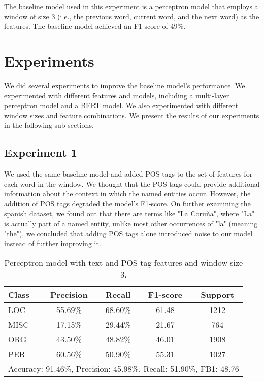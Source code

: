 \documentclass[12pt]{report}
\begin{document}
The baseline model used in this experiment is a perceptron model that employs a window of size 3 (i.e., the previous word, current word, and the next word) as the features. The baseline model achieved an F1-score of 49\%.

\section*{Experiments}

We did several experiments to improve the baseline model's performance. We experimented with different features and models, including a multi-layer perceptron model and a BERT model. We also experimented with different window sizes and feature combinations. We present the results of our experiments in the following sub-sections.
\subsection*{Experiment 1}

We used the same baseline model and added POS tags to the set of features for each word in the window. We thought that the POS tags could provide additional information about the context in which the named entities occur. However, the addition of POS tags degraded the model's F1-score. On further examining the spanish dataset, we found out that there are terms like "La Coruña", where "La" is actually part of a named entity, unlike most other occurrences of "la" (meaning "the"), we concluded that adding POS tags alone introduced noise to our model instead of further improving it.

\begin{table}[h]
	\centering
	\label{tab:exp1}
	\begin{tabular}{lcccc}
		\hline
		\textbf{Class} & \textbf{Precision} & \textbf{Recall} & \textbf{F1-score} & \textbf{Support} \\ \hline
		LOC            & 55.69\%            & 68.60\%         & 61.48             & 1212             \\ \hline
		MISC           & 17.15\%            & 29.44\%         & 21.67             & 764              \\ \hline
		ORG            & 43.50\%            & 48.82\%         & 46.01             & 1908             \\ \hline
		PER            & 60.56\%            & 50.90\%         & 55.31             & 1027             \\ \hline
		\multicolumn{5}{c}{Accuracy: 91.46\%, Precision: 45.98\%, Recall: 51.90\%, FB1: 48.76}       \\ \hline
	\end{tabular}
	\caption{Perceptron model with text and POS tag features and window size 3.}
\end{table}
\end{document}
